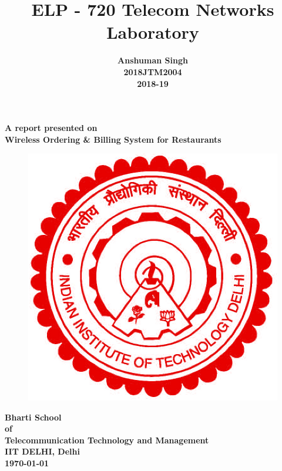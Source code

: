 \documentclass[12pt,a4paper]{article}
\author{\textbf{Anshuman Singh} \\ \textbf{2018JTM2004}\\ \textbf{2018-19}}
\date{}
\title{\textbf{ELP - 720 Telecom Networks Laboratory}}
\begin{document}
	\maketitle
	
	\begin{center}
	\noindent \textbf{\large A report presented on}\\
	\Huge \textbf{Wireless Ordering \& Billing System for Restaurants} 
	\vspace{1cm}
	
	\begin{figure}[h]
	\centering
	\includegraphics[scale=.2]{iitd.jpg}
	
	
	\end{figure}
	\vspace{1.5cm}
	
	\textbf{\Large Bharti School\\of\\Telecommunication Technology and Management\\IIT DELHI, Delhi\\ \today}
	
	\end{center}
	
	\newpage
	\tableofcontents
	\listoffigures
	\newpage
	
\end{document}
